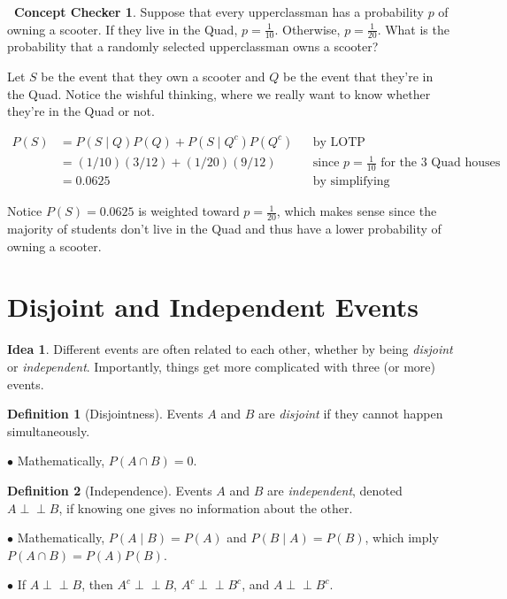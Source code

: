 \documentclass[12pt,oneside]{article}
\newcommand{\indep}{\perp\!\!\!\perp}
\theoremstyle{definition}
\newtheorem{definition}{Definition}
\newtheorem{concept}{\faPen \ Concept Checker}
\newtheorem*{idea}{Idea}
\theoremstyle{remark}
\begin{document}
\begin{concept}
Suppose that every upperclassman has a probability $p$ of owning a scooter. If they live in the Quad, $p = \frac{1}{10}$. Otherwise, $p = \frac{1}{20}$. What is the probability that a randomly selected upperclassman owns a scooter?
\end{concept}

\begin{solutionbox}
Let $S$ be the event that they own a scooter and $Q$ be the event that they’re in the Quad. Notice the wishful thinking, where we really want to know whether they're in the Quad or not.

\[
\begin{aligned}
P(S) &= P(S \mid Q) P(Q) + P(S \mid Q^c) P(Q^c) && \text{by LOTP} \\
&= (1/10)(3/12) + (1/20)(9/12) && \text{since $p = \frac{1}{10}$ for the 3 Quad houses} \\
&= 0.0625 && \text{by simplifying}
\end{aligned}
\]

Notice $P(S) = 0.0625$ is weighted toward $p = \frac{1}{20}$, which makes sense since the majority of students don't live in the Quad and thus have a lower probability of owning a scooter.
\end{solutionbox}

\section{Disjoint and Independent Events}

\begin{idea}
Different events are often related to each other, whether by being \textit{disjoint} or \textit{independent}. Importantly, things get more complicated with three (or more) events.
\end{idea}

\begin{definition}[Disjointness]
Events $A$ and $B$ are \textit{disjoint} if they cannot happen simultaneously.

$\bullet$ Mathematically, $P(A \cap B) = 0$.
\end{definition}

\begin{definition}[Independence]
Events $A$ and $B$ are \textit{independent}, denoted $A \indep B$, if knowing one gives no information about the other.

$\bullet$ Mathematically, $P(A \mid B) = P(A)$ and $P(B \mid A) = P(B)$, which imply $P(A \cap B) = P(A) P(B)$.

$\bullet$ If $A \indep B$, then $A^c \indep B$, $A^c \indep B^c$, and $A \indep B^c$.
\end{definition}
\end{document}
